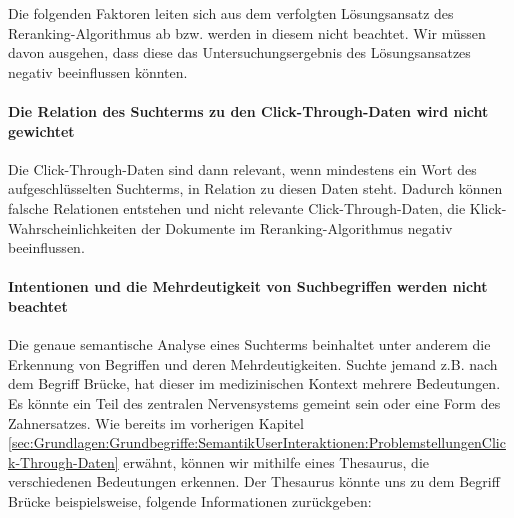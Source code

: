 Die folgenden Faktoren leiten sich aus dem verfolgten Lösungsansatz des Reranking-Algorithmus ab bzw. werden in diesem nicht beachtet. Wir müssen davon ausgehen, dass diese das Untersuchungsergebnis des Lösungsansatzes negativ beeinflussen könnten.

\paragraph{Die Relation des Suchterms zu den Click-Through-Daten wird nicht gewichtet}
Die Click-Through-Daten sind dann relevant, wenn mindestens ein Wort des aufgeschlüsselten Suchterms, in Relation zu diesen Daten steht. Dadurch können falsche Relationen entstehen und nicht relevante Click-Through-Daten, die Klick-Wahrscheinlichkeiten der Dokumente im Reranking-Algorithmus negativ beeinflussen.

\paragraph{Intentionen und die Mehrdeutigkeit von Suchbegriffen werden nicht beachtet}
Die genaue semantische Analyse eines Suchterms beinhaltet unter anderem die Erkennung von Begriffen und deren Mehrdeutigkeiten. Suchte jemand z.B. nach dem Begriff \glqq Brücke\grqq{}, hat dieser im medizinischen Kontext mehrere Bedeutungen. Es könnte \glqq ein Teil des zentralen Nervensystems\grqq{} gemeint sein oder \glqq eine Form des Zahnersatzes\grqq{}. Wie bereits im vorherigen Kapitel \ref{sec:Grundlagen:Grundbegriffe:SemantikUserInteraktionen:ProblemstellungenClick-Through-Daten} erwähnt, können wir mithilfe eines Thesaurus, die verschiedenen Bedeutungen erkennen. Der Thesaurus könnte uns zu dem Begriff \glqq Brücke\grqq{} beispielsweise, folgende Informationen zurückgeben:

